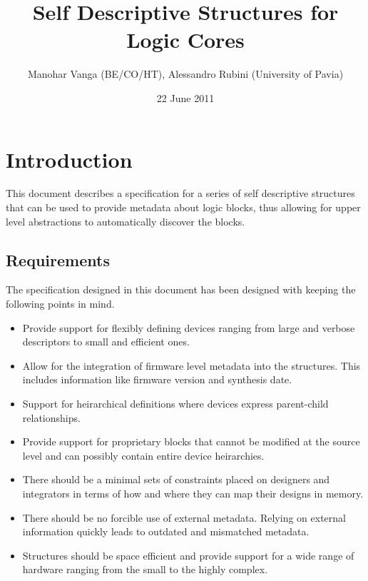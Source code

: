 \documentclass{article}
\title{Self Descriptive Structures for Logic Cores}
\author{Manohar Vanga (BE/CO/HT), Alessandro Rubini (University of Pavia)}
\date{22 June 2011}
\begin{document}
\maketitle

\tableofcontents
\listoftables
\listoffigures

\pagebreak

\section{Introduction}

This document describes a specification for a series of self descriptive
structures that can be used to provide metadata about logic blocks, thus
allowing for upper level abstractions to automatically discover the blocks.

\subsection{Requirements}

The specification designed in this document has been designed with keeping
the following points in mind.

\begin{itemize}
\item Provide support for flexibly defining devices ranging from large and
verbose descriptors to small and efficient ones.
\item Allow for the integration of firmware level metadata into the structures.
This includes information like firmware version and synthesis date.
\item Support for heirarchical definitions where devices express parent-child
relationships.
\item Provide support for proprietary blocks that cannot be modified at the
source level and can possibly contain entire device heirarchies.
\item There should be a minimal sets of constraints placed on designers and
integrators in terms of how and where they can map their designs in memory.
\item There should be no forcible use of external metadata. Relying on external
information quickly leads to outdated and mismatched metadata.
\item Structures should be space efficient and provide support for a wide range
of hardware ranging from the small to the highly complex.
\end{itemize}
\end{document}
